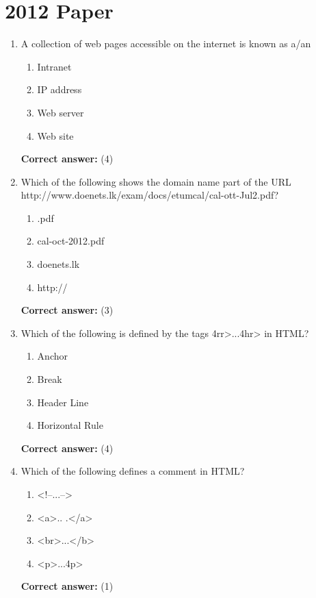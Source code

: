 \documentclass[12pt]{article}
\begin{document}
\section*{2012 Paper}
\begin{enumerate}[label=Q\arabic*:,leftmargin=*,resume]
\item A collection of web pages accessible on the internet is known as a/an\\
\begin{enumerate}[label=(\arabic*)]
\item Intranet
\item IP address
\item Web server
\item Web site
\end{enumerate}
\textbf{Correct answer:} (4)

\item Which of the following shows the domain name part of the URL http://www.doenets.lk/exam/docs/etumcal/cal-ott-Jul2.pdf?\\
\begin{enumerate}[label=(\arabic*)]
\item .pdf
\item cal-oct-2012.pdf
\item doenets.lk
\item http://
\end{enumerate}
\textbf{Correct answer:} (3)

\item Which of the following is defined by the tags 4rr>...4hr> in HTML?\\
\begin{enumerate}[label=(\arabic*)]
\item Anchor
\item Break
\item Header Line
\item Horizontal Rule
\end{enumerate}
\textbf{Correct answer:} (4)

\item Which of the following defines a comment in HTML?\\
\begin{enumerate}[label=(\arabic*)]
\item <!--...-->
\item <a>.. .</a>
\item <br>...</b>
\item <p>...4p>
\end{enumerate}
\textbf{Correct answer:} (1)


\end{enumerate}
\end{document}
